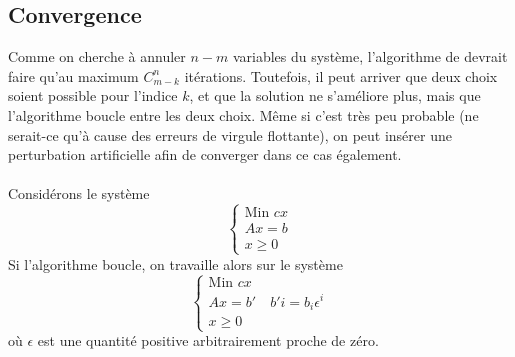 \documentclass[a4paper]{report}
\theoremstyle{definition}
\theoremstyle{remark}
\theoremstyle{plain}
\begin{document}
\subsection{Convergence}
Comme on cherche à annuler \(n-m\) variables du système, l'algorithme de devrait
faire qu'au maximum \(C^n_{m-k}\) itérations. Toutefois, il peut arriver que
deux choix soient possible pour l'indice \(k\), et que la solution ne s'améliore
plus, mais que l'algorithme boucle entre les deux choix. Même si c'est très peu
probable (ne serait-ce qu'à cause des erreurs de virgule flottante), on peut
insérer une perturbation artificielle afin de converger dans ce cas également.

\paragraph{}
Considérons le système
\[\begin{cases}
	\text{Min }cx\\
	Ax=b\\
	x\ge 0
\end{cases}\]
Si l'algorithme boucle, on travaille alors sur le système
\[\begin{cases}
	\text{Min }cx\\
	Ax=b'\quad b'i=b_i\epsilon^i\\
	x\ge 0
\end{cases}\]
où \(\epsilon\) est une quantité positive arbitrairement proche de zéro.
\end{document}
